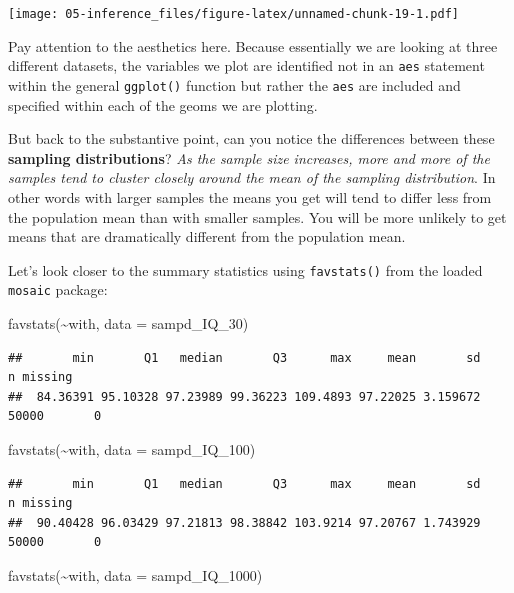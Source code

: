 \documentclass[
]{book}
\newenvironment{Shaded}{\begin{snugshade}}{\end{snugshade}}
\newcommand{\AttributeTok}[1]{\textcolor[rgb]{0.77,0.63,0.00}{#1}}
\newcommand{\FunctionTok}[1]{\textcolor[rgb]{0.00,0.00,0.00}{#1}}
\newcommand{\NormalTok}[1]{#1}
\newcommand{\SpecialCharTok}[1]{\textcolor[rgb]{0.00,0.00,0.00}{#1}}
\begin{document}
\texttt{[image: 05-inference\_files/figure-latex/unnamed-chunk-19-1.pdf]}

Pay attention to the aesthetics here. Because essentially we are looking at three different datasets, the variables we plot are identified not in an \texttt{aes} statement within the general \texttt{ggplot()} function but rather the \texttt{aes} are included and specified within each of the geoms we are plotting.

But back to the substantive point, can you notice the differences between these \textbf{sampling distributions}? \emph{As the sample size increases, more and more of the samples tend to cluster closely around the mean of the sampling distribution}. In other words with larger samples the means you get will tend to differ less from the population mean than with smaller samples. You will be more unlikely to get means that are dramatically different from the population mean.

Let's look closer to the summary statistics using \texttt{favstats()} from the loaded \texttt{mosaic} package:

\begin{Shaded}
\begin{Highlighting}[]
\FunctionTok{favstats}\NormalTok{(}\SpecialCharTok{\textasciitilde{}}\NormalTok{with, }\AttributeTok{data =}\NormalTok{ sampd\_IQ\_30)}
\end{Highlighting}
\end{Shaded}

\begin{verbatim}
##       min       Q1   median       Q3      max     mean       sd     n missing
##  84.36391 95.10328 97.23989 99.36223 109.4893 97.22025 3.159672 50000       0
\end{verbatim}

\begin{Shaded}
\begin{Highlighting}[]
\FunctionTok{favstats}\NormalTok{(}\SpecialCharTok{\textasciitilde{}}\NormalTok{with, }\AttributeTok{data =}\NormalTok{ sampd\_IQ\_100)}
\end{Highlighting}
\end{Shaded}

\begin{verbatim}
##       min       Q1   median       Q3      max     mean       sd     n missing
##  90.40428 96.03429 97.21813 98.38842 103.9214 97.20767 1.743929 50000       0
\end{verbatim}

\begin{Shaded}
\begin{Highlighting}[]
\FunctionTok{favstats}\NormalTok{(}\SpecialCharTok{\textasciitilde{}}\NormalTok{with, }\AttributeTok{data =}\NormalTok{ sampd\_IQ\_1000)}
\end{Highlighting}
\end{Shaded}
\end{document}
